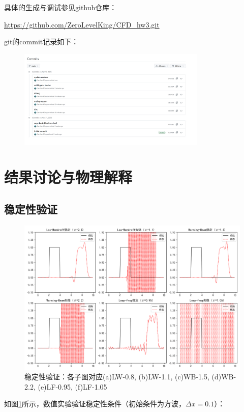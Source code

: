 \documentclass[UTF8]{ctexart}
\begin{document}
具体的生成与调试参见github仓库：
\begin{center}
    \url{https://github.com/ZeroLevelKing/CFD_hw3.git}
\end{center}
git的commit记录如下：

\begin{figure}[H]
    \centering
    \includegraphics[width=0.8\textwidth]{c1.png} 
\end{figure}

\newpage
\section{结果讨论与物理解释}

\subsection{稳定性验证}
\begin{figure}[htbp]
    \centering
    \includegraphics[width=\textwidth]{Figure_1.png}
    \caption{稳定性验证：各子图对应(a)LW-0.8, (b)LW-1.1, (c)WB-1.5, (d)WB-2.2, (e)LF-0.95, (f)LF-1.05}
    \label{fig:stability}
\end{figure}
如图\ref{fig:stability}所示，数值实验验证稳定性条件（初始条件为方波，$\Delta x=0.1$）：
\end{document}
